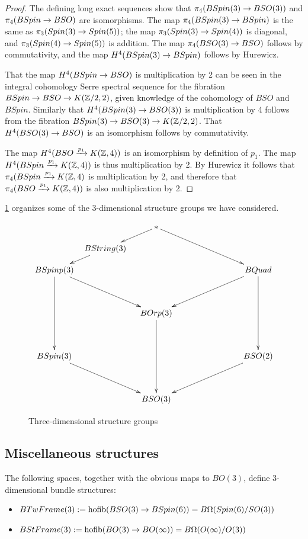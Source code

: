 \documentclass{amsart}
\begin{document}
\begin{proof}
The defining long exact sequences show that $\pi_4(BSpin(3) \rightarrow BSO(3))$ and $\pi_4(BSpin \rightarrow BSO)$ are isomorphisms.  The map $\pi_4(BSpin(3) \rightarrow BSpin)$ is the same as $\pi_3(Spin(3) \rightarrow Spin(5))$; the map $\pi_3(Spin(3) \rightarrow Spin(4))$ is diagonal, and $\pi_3(Spin(4) \rightarrow Spin(5))$ is addition. %
The map $\pi_4(BSO(3) \rightarrow BSO)$ follows by commutativity, and the map $H^4(BSpin(3) \rightarrow BSpin)$ follows by Hurewicz.

That the map $H^4(BSpin \rightarrow BSO)$ is multiplication by 2 can be seen in the integral cohomology Serre spectral sequence for the fibration $BSpin \rightarrow BSO \rightarrow K(\mathbb Z/2,2)$, given knowledge of the cohomology of $BSO$ and $BSpin$.  Similarly that $H^4(BSpin(3) \rightarrow BSO(3))$ is multiplication by 4 follows from the fibration $BSpin(3) \rightarrow BSO(3) \rightarrow K(\mathbb Z/2,2)$.  That $H^4(BSO(3) \rightarrow BSO)$ is an isomorphism follows by commutativity.

The map $H^4(BSO \xrightarrow{p_1} K(\mathbb Z,4))$ is an isomorphism by definition of $p_1$.  The map $H^4(BSpin \xrightarrow{p_1} K(\mathbb Z,4))$ is thus multiplication by 2.  By Hurewicz it follows that $\pi_4(BSpin \xrightarrow{p_1} K(\mathbb Z,4)$ is multiplication by 2, and therefore that $\pi_4(BSO \xrightarrow{p_1} K(\mathbb Z,4))$ is also multiplication by 2.
\end{proof}


\cref{fig-structuregroups} organizes some of the 3-dimensional structure groups we have considered.
\begin{figure}[!ht]
\[
\xymatrix@!R@!C@R=10pt@C=5pt{
&& \ast \ar[dl] \ar[ddrr] && \\
& BString(3) \ar[dl] &&& \\
BSpinp(3) \ar[ddrr] \ar[dddd] &&&& BQuad \ar[ddll] \ar[dddd] \\
&&&& \\
&& BOrp(3) \ar[dddd] && \\
&&&& \\
BSpin(3) \ar[ddrr] &&&& BSO(2) \ar[ddll] \\
&&&& \\
&& BSO(3) &&
}
\]
\caption{Three-dimensional structure groups} \label{fig-structuregroups}
\end{figure}

\subsection{Miscellaneous structures}

\begin{definition}
The following spaces, together with the obvious maps to $BO(3)$, define 3-dimensional bundle structures:
\begin{itemize}
\item[2-Frame:] $BTwFrame(3) := \operatorname{hofib}(BSO(3) \rightarrow BSpin(6)) = B\Omega(Spin(6)/SO(3))$
\item[StFrame:] $BStFrame(3) := \operatorname{hofib}(BO(3) \rightarrow BO(\infty)) = B\Omega(O(\infty)/O(3))$
\end{itemize}
\end{definition}
\end{document}
